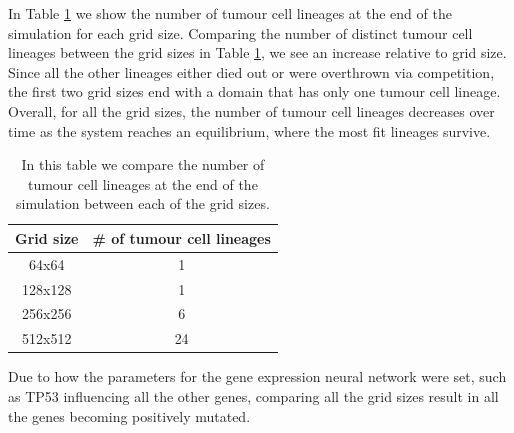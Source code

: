 \documentclass[\main/thesis.tex]{subfiles}
\begin{document}
In Table \ref{table:numLineagesGridSizeComparison} we show the number of tumour cell lineages at the end of the simulation for each grid size. Comparing the number of distinct tumour cell lineages between the grid sizes in Table \ref{table:numLineagesGridSizeComparison}, we see an increase relative to grid size. Since all the other lineages either died out or were overthrown via competition, the first two grid sizes end with a domain that has only one tumour cell lineage. Overall, for all the grid sizes, the number of tumour cell lineages decreases over time as the system reaches an equilibrium, where the most fit lineages survive. 
\begin{table}[H]
\centering
\begin{tabular}{|c|c|}
	\hline
	Grid size & \# of tumour cell lineages\\
	\hline
	64x64 & 1 \\
	128x128 & 1 \\
	256x256 & 6 \\
	512x512 & 24 \\
	\hline
\end{tabular}
\caption{In this table we compare the number of tumour cell lineages at the end of the simulation between each of the grid sizes.}
\label{table:numLineagesGridSizeComparison} 
\end{table}

Due to how the parameters for the gene expression neural network were set, such as TP53 influencing all the other genes, comparing all the grid sizes result in all the genes becoming positively mutated.
\end{document}
